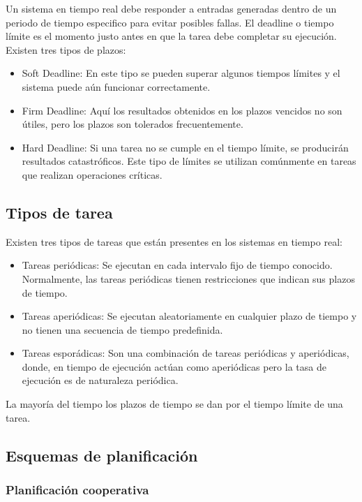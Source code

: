     Un sistema en tiempo real debe  responder a entradas generadas dentro de un periodo de tiempo especifico para evitar posibles fallas. El deadline o tiempo límite es el momento justo antes en que la tarea debe completar su ejecución. Existen tres tipos de plazos: 
\begin{itemize}
\item Soft Deadline: En este tipo se pueden superar algunos tiempos límites y el sistema puede aún funcionar correctamente.
\item Firm Deadline: Aquí los resultados obtenidos en los plazos vencidos no son útiles, pero los plazos son tolerados frecuentemente.
\item Hard Deadline: Si una tarea no se cumple en el tiempo límite, se producirán resultados catastróficos. Este tipo de límites se utilizan comúnmente en tareas que realizan operaciones críticas.
\end{itemize}   

\subsection{Tipos de tarea}

Existen tres tipos de tareas que están presentes en los sistemas en tiempo real:

\begin{itemize}
\item Tareas periódicas: Se ejecutan en cada intervalo fijo de tiempo conocido. Normalmente, las tareas periódicas tienen restricciones que indican sus plazos de tiempo.
\item Tareas aperiódicas: Se ejecutan aleatoriamente en cualquier plazo de tiempo y no tienen una secuencia de tiempo predefinida.
\item Tareas esporádicas: Son una combinación de tareas periódicas y aperiódicas, donde, en tiempo de ejecución actúan como aperiódicas pero la tasa de ejecución es de naturaleza periódica.
\end{itemize}   

La mayoría del tiempo los plazos de tiempo se dan por el tiempo límite de una tarea.

    \subsection{Esquemas de planificación}
    
        \subsubsection{Planificación cooperativa}

